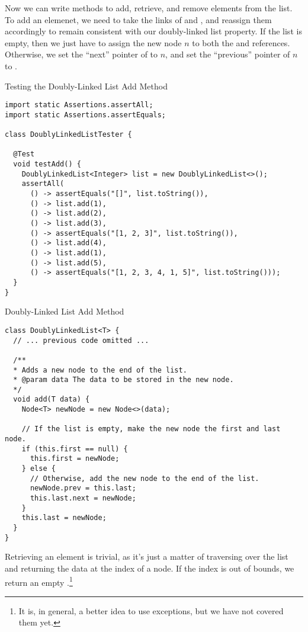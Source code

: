 Now we can write methods to add, retrieve, and remove elements from the list. To add an elemenet, we need to take the links of  and , and reassign them accordingly to remain consistent with our doubly-linked list property. If the list is empty, then we just have to assign the new node $n$ to both the  and  references. Otherwise, we set the ``next'' pointer of  to $n$, and set the ``previous'' pointer of $n$ to . 

\begin{cl}[]{Testing the Doubly-Linked List Add Method}
\begin{lstlisting}[language=MyJava]
import static Assertions.assertAll;
import static Assertions.assertEquals;

class DoublyLinkedListTester {

  @Test
  void testAdd() {
    DoublyLinkedList<Integer> list = new DoublyLinkedList<>();
    assertAll(
      () -> assertEquals("[]", list.toString()),
      () -> list.add(1),
      () -> list.add(2),
      () -> list.add(3),
      () -> assertEquals("[1, 2, 3]", list.toString()),
      () -> list.add(4),
      () -> list.add(1),
      () -> list.add(5),
      () -> assertEquals("[1, 2, 3, 4, 1, 5]", list.toString()));
  }
}
\end{lstlisting}
\end{cl}

\begin{cl}[]{Doubly-Linked List Add Method}
\begin{lstlisting}[language=MyJava]
class DoublyLinkedList<T> {
  // ... previous code omitted ...

  /**
  * Adds a new node to the end of the list.
  * @param data The data to be stored in the new node.
  */
  void add(T data) {
    Node<T> newNode = new Node<>(data);

    // If the list is empty, make the new node the first and last node.
    if (this.first == null) {
      this.first = newNode;
    } else {
      // Otherwise, add the new node to the end of the list.
      newNode.prev = this.last;
      this.last.next = newNode;
    }
    this.last = newNode;
  }
}
\end{lstlisting}
\end{cl}

Retrieving an element is trivial, as it's just a matter of traversing over the list and returning the data at the index of a node. If the index is out of bounds, we return an empty .\footnote{It is, in general, a better idea to use exceptions, but we have not covered them yet.}

